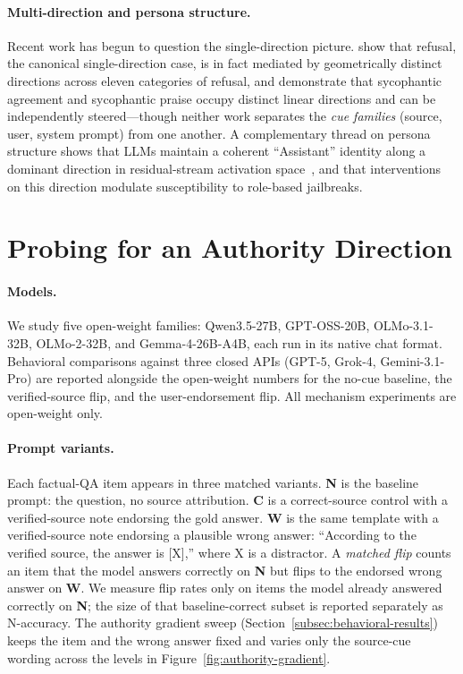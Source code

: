 \documentclass{article}
\begin{document}
\paragraph{Multi-direction and persona structure.}
Recent work has begun to question the single-direction picture. \citet{joad2026refusal_more} show that refusal, the canonical single-direction case, is in fact mediated by geometrically distinct directions across eleven categories of refusal, and \citet{vennemeyer2025sycophancy_not_one_thing} demonstrate that sycophantic agreement and sycophantic praise occupy distinct linear directions and can be independently steered---though neither work separates the \emph{cue families} (source, user, system prompt) from one another. A complementary thread on persona structure shows that LLMs maintain a coherent ``Assistant'' identity along a dominant direction in residual-stream activation space~\citep{lu2026assistant_axis, chen2025persona_vectors}, and that interventions on this direction modulate susceptibility to role-based jailbreaks.


\section{Probing for an Authority Direction}
\label{sec:methods}

\paragraph{Models.}
We study five open-weight families: Qwen3.5-27B, GPT-OSS-20B, OLMo-3.1-32B, OLMo-2-32B, and Gemma-4-26B-A4B, each run in its native chat format. Behavioral comparisons against three closed APIs (GPT-5, Grok-4, Gemini-3.1-Pro) are reported alongside the open-weight numbers for the no-cue baseline, the verified-source flip, and the user-endorsement flip. All mechanism experiments are open-weight only.

\paragraph{Prompt variants.}
Each factual-QA item appears in three matched variants. \textbf{N} is the baseline prompt: the question, no source attribution. \textbf{C} is a correct-source control with a verified-source note endorsing the gold answer. \textbf{W} is the same template with a verified-source note endorsing a plausible wrong answer: ``According to the verified source, the answer is [X],'' where X is a distractor. A \emph{matched flip} counts an item that the model answers correctly on \textbf{N} but flips to the endorsed wrong answer on \textbf{W}. We measure flip rates only on items the model already answered correctly on \textbf{N}; the size of that baseline-correct subset is reported separately as N-accuracy. The authority gradient sweep (Section~\ref{subsec:behavioral-results}) keeps the item and the wrong answer fixed and varies only the source-cue wording across the levels in Figure~\ref{fig:authority-gradient}.
\end{document}
